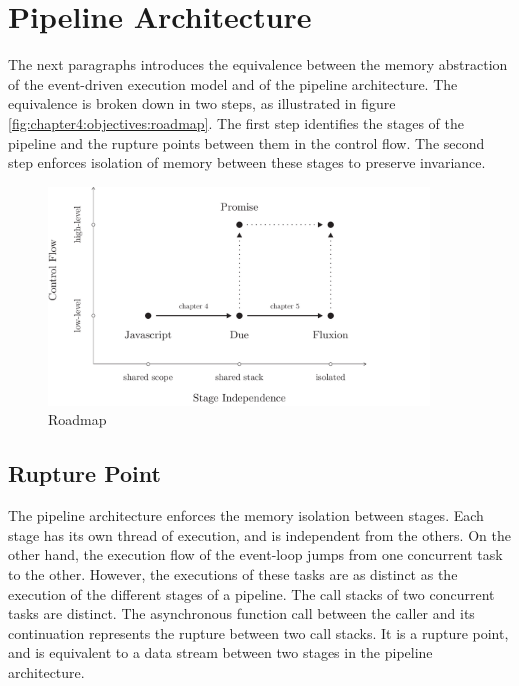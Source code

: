 \section{Pipeline Architecture} \label{chapter4:pipeline}

The next paragraphs introduces the equivalence between the memory abstraction of the event-driven execution model and of the pipeline architecture.
The equivalence is broken down in two steps, as illustrated in figure \ref{fig:chapter4:objectives:roadmap}.
The first step identifies the stages of the pipeline and the rupture points between them in the control flow.
The second step enforces isolation of memory between these stages to preserve invariance.

\begin{figure}[h!]
\begin{center}
\includegraphics[width=0.9\textwidth]{../resources/roadmap.pdf}
\end{center}
\caption{Roadmap}
\label{fig:roadmap}
\end{figure}

\subsection{Rupture Point}

The pipeline architecture enforces the memory isolation between stages.
Each stage has its own thread of execution, and is independent from the others.
On the other hand, the execution flow of the event-loop jumps from one concurrent task to the other.
However, the executions of these tasks are as distinct as the execution of the different stages of a pipeline.
The call stacks of two concurrent tasks are distinct.
The asynchronous function call between the caller and its continuation represents the rupture between two call stacks.
It is a rupture point, and is equivalent to a data stream between two stages in the pipeline architecture.


